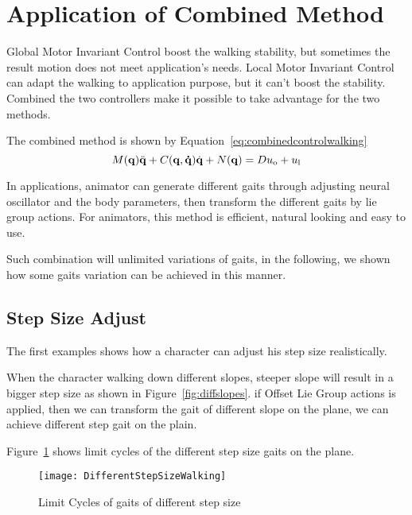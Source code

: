 \section{Application of Combined Method}
Global Motor Invariant Control boost the walking stability, but sometimes  the result motion does not meet application's needs.
Local Motor Invariant Control can adapt the walking to application purpose, but it can't boost the stability.
Combined the two controllers make it possible to take advantage for the two methods.

The combined method is shown by Equation~\ref{eq:combinedcontrolwalking}
\begin{equation}
\label{eq:combinedcontrolwalking}
M(\mathbf{q}) \ddot{\mathbf{q}} + C(\mathbf{q,\dot{q}})\dot{\mathbf{q}} + N(\mathbf{q}) = Du_{\mathrm{o}}+u_{\mathrm{l}}
\end{equation}

In applications, animator can generate different gaits through  adjusting neural oscillator and the body parameters, then transform the different gaits by lie group actions.
For animators, this method is efficient, natural looking and easy to use.

Such combination will unlimited variations of gaits, in the following, we shown how some gaits variation can be achieved in this manner. 

\subsection{Step Size Adjust}
The first examples shows how a character can adjust his step size realistically.



When the character walking down different slopes, steeper slope will result in a bigger step size as shown in Figure~\ref{fig:diffslopes}. 
if Offset Lie Group actions is applied, then we can transform the gait of different slope on the plane, we can achieve different step gait on the plain.

Figure~\ref{fig:differentstepsizeonplaine} shows limit cycles of the different step size gaits on the plane.
\begin{figure}[!htbp]
  \begin{center}
      \texttt{[image: DifferentStepSizeWalking]}
    \caption{Limit Cycles of gaits of different step size}
    \label{fig:differentstepsizeonplaine}
\end{center}
\end{figure}


